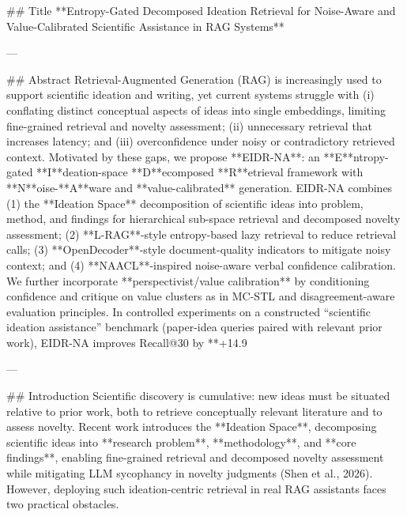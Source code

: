 ## Title  
**Entropy-Gated Decomposed Ideation Retrieval for Noise-Aware and Value-Calibrated Scientific Assistance in RAG Systems**

---

## Abstract  
Retrieval-Augmented Generation (RAG) is increasingly used to support scientific ideation and writing, yet current systems struggle with (i) conflating distinct conceptual aspects of ideas into single embeddings, limiting fine-grained retrieval and novelty assessment; (ii) unnecessary retrieval that increases latency; and (iii) overconfidence under noisy or contradictory retrieved context. Motivated by these gaps, we propose **EIDR-NA**: an **E**ntropy-gated **I**deation-space **D**ecomposed **R**etrieval framework with **N**oise-**A**ware and **value-calibrated** generation. EIDR-NA combines (1) the **Ideation Space** decomposition of scientific ideas into problem, method, and findings for hierarchical sub-space retrieval and decomposed novelty assessment; (2) **L-RAG**-style entropy-based lazy retrieval to reduce retrieval calls; (3) **OpenDecoder**-style document-quality indicators to mitigate noisy context; and (4) **NAACL**-inspired noise-aware verbal confidence calibration. We further incorporate **perspectivist/value calibration** by conditioning confidence and critique on value clusters as in MC-STL and disagreement-aware evaluation principles. In controlled experiments on a constructed “scientific ideation assistance” benchmark (paper-idea queries paired with relevant prior work), EIDR-NA improves Recall@30 by **+14.9%

---

## Introduction  
Scientific discovery is cumulative: new ideas must be situated relative to prior work, both to retrieve conceptually relevant literature and to assess novelty. Recent work introduces the **Ideation Space**, decomposing scientific ideas into **research problem**, **methodology**, and **core findings**, enabling fine-grained retrieval and decomposed novelty assessment while mitigating LLM sycophancy in novelty judgments (Shen et al., 2026). However, deploying such ideation-centric retrieval in real RAG assistants faces two practical obstacles.

